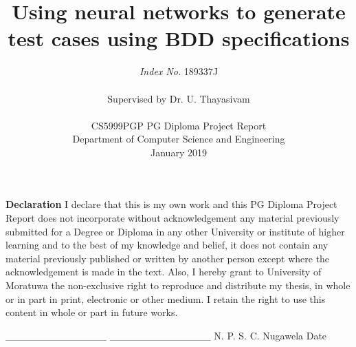 \documentclass[conference, onecolumn, a4, 12pt]{IEEEtran}
\newcommand\tab[1][1cm]{\hspace*{#1}}
\begin{document}
\title{Using neural networks to generate test cases using BDD specifications}

\author{
\textit{Index No.} 189337J \\
\\

Supervised by Dr. U. Thayasivam \\
\\

CS5999PGP PG Diploma Project Report	\\
Department of Computer Science and Engineering\\
January 2019
}

\maketitle
\pagebreak
\setcounter{page}{1}
\pagestyle{plain}

\begin{center}
\textbf{Declaration}\newline
I declare that this is my own work and this PG Diploma Project Report does not incorporate without acknowledgement any material previously submitted for a Degree or Diploma in any other University or institute of higher learning and to the best of my knowledge and belief, it does not contain any material previously published or written by another person except where the acknowledgement is made in the text.\newline
Also, I hereby grant to University of Moratuwa the non-exclusive right to reproduce and distribute my thesis, in whole or in part in print, electronic or other medium. I retain the right to use this content in whole or part in future works.\newline
\end{center}

\_\_\_\_\_\_\_\_\_\_\_\_\_\_ \tab\tab\tab\tab\tab\tab\tab \_\_\_\_\_\_\_\_\_\_\_\_\_\_\newline\newline
N. P. S. C. Nugawela \tab\tab\tab\tab\tab\tab\tab Date \newline
\end{document}
